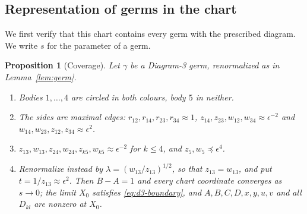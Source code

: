 \documentclass[11pt]{amsart}
\newenvironment{romanlist}{\begin{enumerate}\renewcommand{\labelenumi}{(\roman{enumi})}%
  \renewcommand{\theenumi}{\roman{enumi}}}{\end{enumerate}}
\newtheorem{proposition}[theorem]{Proposition}
\theoremstyle{definition}
\theoremstyle{remark}
\begin{document}
\subsection{Representation of germs in the chart}
{We first verify that this chart contains every germ with the prescribed diagram.
We write $s$ for the parameter of a germ.}

\begin{proposition}[Coverage]\label{prop:d3-cover}
Let $\gamma$ be a Diagram-3 germ, renormalized as in Lemma~\ref{lem:germ}.
\begin{romanlist}
  \item Bodies $1,\dots,4$ are circled in both colours, body $5$ in neither.
  \item The sides are maximal edges: $r_{12},r_{14},r_{23},r_{34}\approx1$,
  $z_{14},z_{23},w_{12},w_{34}\approx\epsilon^{-2}$ and $w_{14},w_{23},z_{12},z_{34}\approx\epsilon^2$.
  \item $z_{13},w_{13},z_{24},w_{24},z_{k5},w_{k5}\approx\epsilon^{-2}$ for $k\le4$, and
  $z_5,w_5\preccurlyeq\epsilon^4$.
  \item Renormalize instead by $\lambda=(w_{13}/z_{13})^{1/2}$, so that $z_{13}=w_{13}$, and put
  $t=1/z_{13}\approx\epsilon^2$.  Then $B-A=1$ and every chart coordinate converges as $s\to0$; the
  limit $X_0$ satisfies \eqref{eq:d3-boundary}, and $A,B,C,D,x,y,u,v$ and all $D_{kl}$ are
  nonzero at $X_0$.
\end{romanlist}
\end{proposition}
\end{document}
